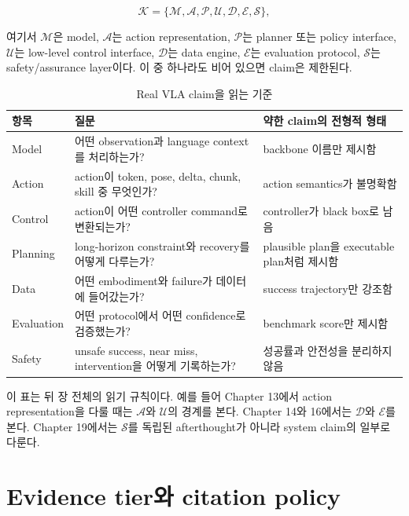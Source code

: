 \begin{equation}
  \mathcal{K}
  =
  \{ \mathcal{M}, \mathcal{A}, \mathcal{P}, \mathcal{U},
     \mathcal{D}, \mathcal{E}, \mathcal{S} \},
  \label{eq:ch0-claim-contract}
\end{equation}

여기서 $\mathcal{M}$은 model, $\mathcal{A}$는 action representation, $\mathcal{P}$는 planner 또는 policy interface, $\mathcal{U}$는 low-level control interface, $\mathcal{D}$는 data engine, $\mathcal{E}$는 evaluation protocol, $\mathcal{S}$는 safety/assurance layer이다. 이 중 하나라도 비어 있으면 claim은 제한된다.

\begin{table}[ht]
\centering
\caption{Real VLA claim을 읽는 기준}
\label{tab:ch0-claim-criteria}
\small
\begin{tabularx}{\textwidth}{p{24mm}X X}
\toprule
항목 & 질문 & 약한 claim의 전형적 형태 \\
\midrule
Model & 어떤 observation과 language context를 처리하는가? & backbone 이름만 제시함 \\
Action & action이 token, pose, delta, chunk, skill 중 무엇인가? & action semantics가 불명확함 \\
Control & action이 어떤 controller command로 변환되는가? & controller가 black box로 남음 \\
Planning & long-horizon constraint와 recovery를 어떻게 다루는가? & plausible plan을 executable plan처럼 제시함 \\
Data & 어떤 embodiment와 failure가 데이터에 들어갔는가? & success trajectory만 강조함 \\
Evaluation & 어떤 protocol에서 어떤 confidence로 검증했는가? & benchmark score만 제시함 \\
Safety & unsafe success, near miss, intervention을 어떻게 기록하는가? & 성공률과 안전성을 분리하지 않음 \\
\bottomrule
\end{tabularx}
\end{table}

이 표는 뒤 장 전체의 읽기 규칙이다. 예를 들어 Chapter 13에서 action representation을 다룰 때는 $\mathcal{A}$와 $\mathcal{U}$의 경계를 본다. Chapter 14와 16에서는 $\mathcal{D}$와 $\mathcal{E}$를 본다. Chapter 19에서는 $\mathcal{S}$를 독립된 afterthought가 아니라 system claim의 일부로 다룬다.

\section{Evidence tier와 citation policy}

